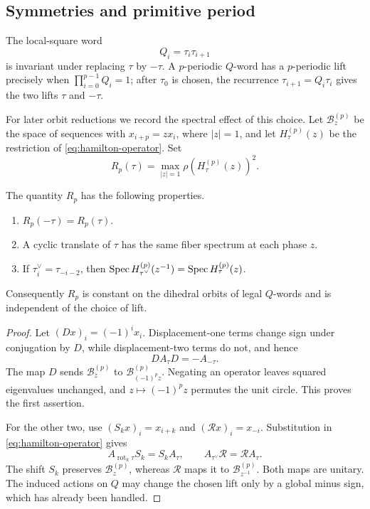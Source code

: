 \subsection{Symmetries and primitive period}
\label{sec:symmetries}

The local-square word
\begin{equation}
 Q_i=\tau_i\tau_{i+1}
 \label{eq:q-word}
\end{equation}
is invariant under replacing $\tau$ by $-\tau$.  A $p$-periodic $Q$-word has
a $p$-periodic lift precisely when $\prod_{i=0}^{p-1}Q_i=1$; after $\tau_0$
is chosen, the recurrence $\tau_{i+1}=Q_i\tau_i$ gives the two lifts $\tau$
and $-\tau$.

For later orbit reductions we record the spectral effect of this choice.  Let
$\mathcal B_z^{(p)}$ be the space of sequences with $x_{i+p}=zx_i$, where
$|z|=1$, and let $H_\tau^{(p)}(z)$ be the restriction of
\eqref{eq:hamilton-operator}.  Set
\begin{equation}
 R_p(\tau)=\max_{|z|=1}\rho(H_\tau^{(p)}(z))^2.
 \label{eq:bloch-edge}
\end{equation}

\begin{proposition}
\label{prop:invariances}
The quantity $R_p$ has the following properties.
\begin{enumerate}
 \item $R_p(-\tau)=R_p(\tau)$.
 \item A cyclic translate of $\tau$ has the same fiber spectrum at each
       phase $z$.
 \item If $\tau^\vee_i=\tau_{-i-2}$, then
       $\operatorname{Spec} H_{\tau^\vee}^{(p)}(z^{-1})=
        \operatorname{Spec} H_\tau^{(p)}(z)$.
\end{enumerate}
Consequently $R_p$ is constant on the dihedral orbits of legal $Q$-words and
is independent of the choice of lift.
\end{proposition}

\begin{proof}
Let $(Dx)_i=(-1)^i x_i$.  Displacement-one terms change sign under conjugation
by $D$, while displacement-two terms do not, and hence
\[
 D A_\tau D=-A_{-\tau}.
\]
The map $D$ sends $\mathcal B_z^{(p)}$ to
$\mathcal B_{(-1)^p z}^{(p)}$.  Negating an operator leaves squared
eigenvalues unchanged, and $z\mapsto(-1)^pz$ permutes the unit circle.  This
proves the first assertion.

For the other two, use $(S_kx)_i=x_{i+k}$ and $(\mathcal Rx)_i=x_{-i}$.
Substitution in \eqref{eq:hamilton-operator} gives
\[
 A_{\operatorname{rot}_k\tau}S_k=S_kA_\tau,
 \qquad
 A_{\tau^\vee}\mathcal R=\mathcal RA_\tau.
\]
The shift $S_k$ preserves $\mathcal B_z^{(p)}$, whereas $\mathcal R$ maps it
to $\mathcal B_{z^{-1}}^{(p)}$.  Both maps are unitary.  The induced actions on
$Q$ may change the chosen lift only by a global minus sign, which has already
been handled.
\end{proof}

